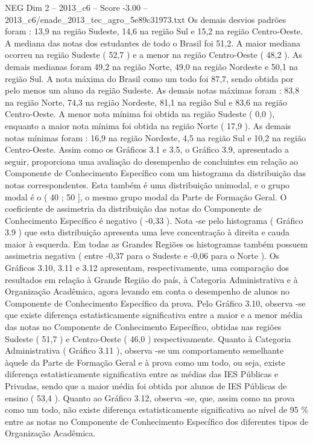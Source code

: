 \begin{textsample}{NEG Dim 2 – 2013\_c6 – Score -3.00 – 2013\_c6/enade\_2013\_tec\_agro\_5e89c31973.txt}
Os demais desvios padrões foram : 13,9 na região Sudeste, 14,6 na região Sul e 15,2 na região Centro-Oeste.
A mediana das notas dos estudantes de todo o Brasil foi 51,2.
A maior mediana ocorreu na região Sudeste ( 52,7 ) e a menor na região Centro-Oeste ( 48,2 ).
As demais medianas foram 49,2 na região Norte, 49,0 na região Nordeste e 50,1 na região Sul.
A nota máxima do Brasil como um todo foi 87,7, sendo obtida por pelo menos um aluno da região Sudeste.
As demais notas máximas foram : 83,8 na região Norte, 74,3 na região Nordeste, 81,1 na região Sul e 83,6 na região Centro-Oeste.
A menor nota mínima foi obtida na região Sudeste ( 0,0 ), enquanto a maior nota mínima foi obtida na região Norte ( 17,9 ).
As demais notas mínimas foram : 16,9 na região Nordeste, 4,5 na região Sul e 10,2 na região Centro-Oeste.
Assim como os Gráficos 3.1 e 3.5, o Gráfico 3.9, apresentado a seguir, proporciona uma avaliação do desempenho de concluintes em relação ao Componente de Conhecimento Específico com um histograma da distribuição das notas correspondentes.
Esta também é uma distribuição unimodal, e o grupo modal é o ( 40 ; 50 ], o mesmo grupo modal da Parte de Formação Geral.
O coeficiente de assimetria da distribuição das notas do Componente de Conhecimento Específico é negativo ( -0,33 ).
Nota -se pelo histograma ( Gráfico 3.9 ) que esta distribuição apresenta uma leve concentração à direita e cauda maior à esquerda.
Em todas as Grandes Regiões os histogramas também possuem assimetria negativa ( entre -0,37 para o Sudeste e -0,06 para o Norte ).
Os Gráficos 3.10, 3.11 e 3.12 apresentam, respectivamente, uma comparação dos resultados em relação à Grande Região do país, à Categoria Administrativa e à Organização Acadêmica, agora levando em conta o desempenho de alunos no Componente de Conhecimento Específico da prova.
Pelo Gráfico 3.10, observa -se que existe diferença estatisticamente significativa entre a maior e a menor média das notas no Componente de Conhecimento Específico, obtidas nas regiões Sudeste ( 51,7 ) e Centro-Oeste ( 46,0 ) respectivamente.
Quanto à Categoria Administrativa ( Gráfico 3.11 ), observa -se um comportamento semelhante àquele da Parte de Formação Geral e à prova como um todo, ou seja, existe diferença estatisticamente significativa entre as médias das IES Públicas e Privadas, sendo que a maior média foi obtida por alunos de IES Públicas de ensino ( 53,4 ).
Quanto ao Gráfico 3.12, observa -se, que, assim como na prova como um todo, não existe diferença estatisticamente significativa ao nível de 95 \% entre as notas no Componente de Conhecimento Específico dos diferentes tipos de Organização Acadêmica.

\end{textsample}
